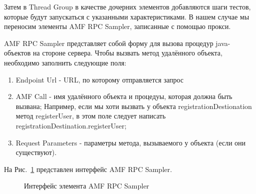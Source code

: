 Затем в Thread Group в качестве дочерних элементов добавляются шаги тестов, которые
будут запускаться с указанными характеристиками. В нашем случае мы переносим элементы
AMF RPC Sampler, записанные с помощью прокси.

AMF RPC Sampler представляет собой форму для вызова процедур java-объектов на стороне
сервера. Чтобы вызвать метод удалённого объекта, необходимо заполнить следующие
поля: 

\begin{enumerate}
\item Endpoint Url - URL, по которому отправляется запрос
\item AMF Call - имя удалённого объекта и процедуы, которая должна быть вызвана; 
Например, если мы хоти вызвать у объекта registrationDestionation метод registerUser, 
в этом поле следует написать registrationDestination.registerUser;
\item Request Parameters - параметры метода, вызываемого у объекта (если они 
существуют).
\end{enumerate}

На Рис.~\ref{ris:amfSampler.png} представлен интерфейс AMF RPC Sampler.
\begin{figure}[ht]
\caption{Интерфейс элемента AMF RPC Sampler}
\label{ris:amfSampler.png}
\end{figure}
 
